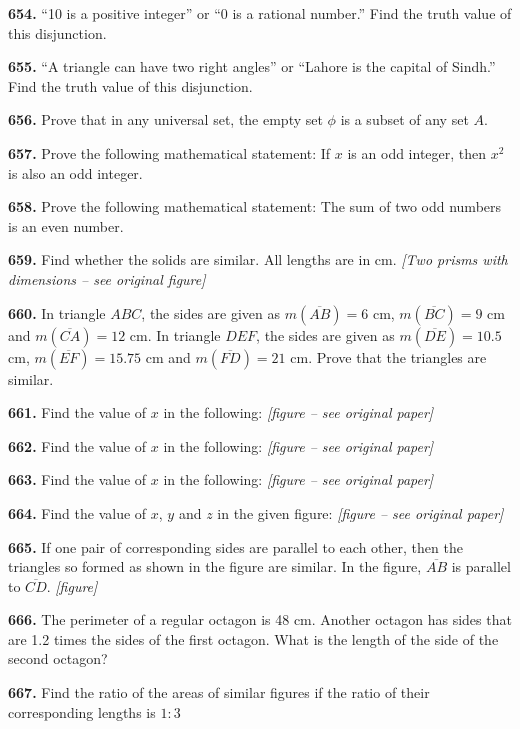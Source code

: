 \documentclass[11pt]{article}
\newcommand{\seg}[1]{\overline{#1}}
\begin{document}
\bigskip
\noindent\textbf{654.} ``10 is a positive integer'' or ``0 is a rational number.'' Find the truth value of this disjunction.

\bigskip
\noindent\textbf{655.} ``A triangle can have two right angles'' or ``Lahore is the capital of Sindh.'' Find the truth value of this disjunction.

\bigskip
\noindent\textbf{656.} Prove that in any universal set, the empty set $\phi$ is a subset of any set $A$.

\bigskip
\noindent\textbf{657.} Prove the following mathematical statement: If $x$ is an odd integer, then $x^2$ is also an odd integer.

\bigskip
\noindent\textbf{658.} Prove the following mathematical statement: The sum of two odd numbers is an even number.

\bigskip
\noindent\textbf{659.} Find whether the solids are similar. All lengths are in cm. \emph{[Two prisms with dimensions -- see original figure]}

\bigskip
\noindent\textbf{660.} In triangle $ABC$, the sides are given as $m(\seg{AB})=6$ cm, $m(\seg{BC})=9$ cm and $m(\seg{CA})=12$ cm. In triangle $DEF$, the sides are given as $m(\seg{DE})=10.5$ cm, $m(\seg{EF})=15.75$ cm and $m(\seg{FD})=21$ cm. Prove that the triangles are similar.

\bigskip
\noindent\textbf{661.} Find the value of $x$ in the following: \emph{[figure -- see original paper]}

\bigskip
\noindent\textbf{662.} Find the value of $x$ in the following: \emph{[figure -- see original paper]}

\bigskip
\noindent\textbf{663.} Find the value of $x$ in the following: \emph{[figure -- see original paper]}

\bigskip
\noindent\textbf{664.} Find the value of $x$, $y$ and $z$ in the given figure: \emph{[figure -- see original paper]}

\bigskip
\noindent\textbf{665.} If one pair of corresponding sides are parallel to each other, then the triangles so formed as shown in the figure are similar. In the figure, $\seg{AB}$ is parallel to $\seg{CD}$. \emph{[figure]}

\bigskip
\noindent\textbf{666.} The perimeter of a regular octagon is 48 cm. Another octagon has sides that are 1.2 times the sides of the first octagon. What is the length of the side of the second octagon?

\bigskip
\noindent\textbf{667.} Find the ratio of the areas of similar figures if the ratio of their corresponding lengths is $1:3$
\end{document}
